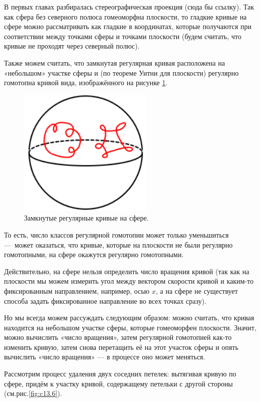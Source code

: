 В первых главах разбиралась стереографическая проекция (сюда бы ссылку). Так как сфера без северного полюса гомеоморфна плоскости, то гладкие кривые на сфере можно рассматривать как гладкие в координатах, которые получаются при соответствии между точками сферы и точками плоскости (будем считать, что кривые не проходят через северный полюс).

Также можем считать, что замкнутая регулярная кривая расположена на «небольшом» участке сферы и (по теореме Уитни для плоскости) регулярно гомотопна кривой вида, изображённого на рисунке \ref{fig:c13.5}.

\begin{figure}[htbp]
    \centering
    \includegraphics[scale=0.7]{images/c13.5.png}
    \caption{Замкнутые регулярные кривые на сфере.}
    \label{fig:c13.5}
\end{figure}

То есть, число классов регулярной гомотопии может только уменьшиться — может оказаться, что кривые, которые на плоскости не были регулярно гомотопными, на сфере окажутся регулярно гомотопными.

Действительно, на сфере нельзя определить число вращения кривой (так как на плоскости мы можем измерить угол между вектором скорости кривой и каким-то фиксированным направлением, например, осью $x$, а на сфере не существует способа задать фиксированное направление во всех точках сразу).

Но мы всегда можем рассуждать следующим образом: можно считать, что кривая находится на небольшом участке сферы, которые гомеоморфен плоскости. Значит, можно вычислить «число вращения», затем регулярной гомотопией как-то изменить кривую, затем снова перетащить её на этот участок сферы и опять вычислить «число вращения» — в процессе оно может меняться.

Рассмотрим процесс удаления двух соседних петелек: вытягивая кривую по сфере, придём к участку кривой, содержащему петельки с другой стороны (см.рис.\ref{fig:c13.6}).

